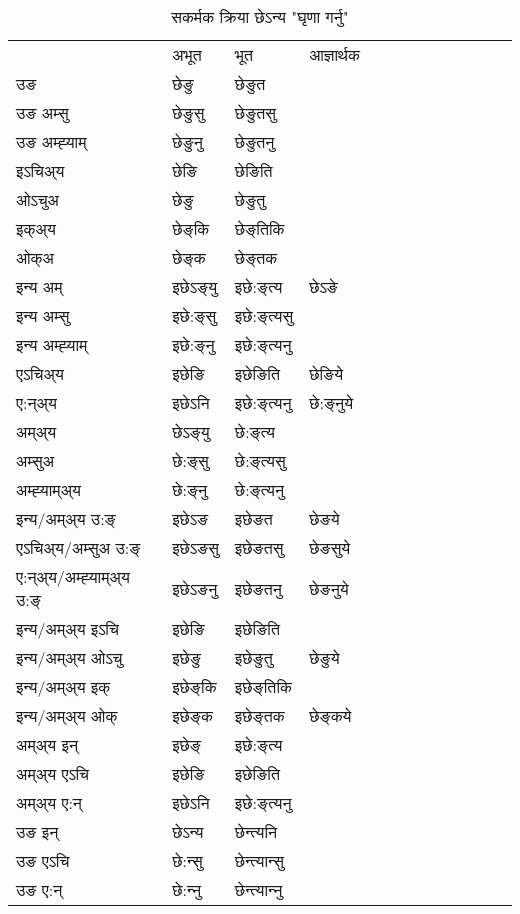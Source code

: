 \begin{table}[H]
\label{eŋ.vt} \centering
\caption{सकर्मक क्रिया  छेऽन्य  "घृणा गर्नु"  }
\begin{tabular}{l|l|l|l|l|l|l|l|l|l|l|l|l}  \toprule
&अभूत & भूत & आज्ञार्थक \\ 
उङ &छेङु &छेङुत \\ 
उङ अम्सु &छेङुसु &छेङुतसु \\ 
उङ अम्ह्‍याम् &छेङुनु &छेङुतनु \\ 
इऽचिअ्य &छेङि &छेङिति   \\ 
ओऽचुअ &छेङु &छेङुतु   \\ 
इक्अ्य &छेङ्‌कि &छेङ्‌तिकि   \\ 
ओक्अ &छेङ्‌क &छेङ्‌तक   \\ 
इन्य अम् & इछेऽङ्‌यु  & इछे:ङ्‌त्य &छेऽङे  \\ 
इन्य अम्सु & इछे:ङ्‌सु  & इछे:ङ्‌त्यसु   \\ 
इन्य अम्ह्‍याम् & इछे:ङ्‌नु  & इछे:ङ्‌त्यनु   \\ 
एऽचिअ्य & इछेङि & इछेङिति &छेङिये    \\ 
ए:न्अ्य & इछेऽनि  & इछे:ङ्‌त्यनु &छे:ङ्‌नुये  \\ 
अम्अ्य & छेऽङ्‌यु  & छे:ङ्‌त्य  \\ 
अम्सुअ & छे:ङ्‌सु & छे:ङ्‌त्यसु  \\ 
अम्ह्‍याम्अ्य & छे:ङ्‌नु  & छे:ङ्‌त्यनु \\ 
\midrule
इन्य/अम्अ्य उ:ङ्‌&इछेऽङ & इछेङत &छेङये \\ 
एऽचिअ्य/अम्सुअ उ:ङ्‌ &इछेऽङसु & इछेङतसु &छेङसुये \\ 
ए:न्अ्य/अम्ह्‍याम्अ्य उ:ङ्‌ &इछेऽङनु & इछेङतनु &छेङनुये \\ 
इन्य/अम्अ्य इऽचि & इछेङि & इछेङिति    \\ 
इन्य/अम्अ्य ओऽचु & इछेङु & इछेङुतु  &छेङुये  \\ 
इन्य/अम्अ्य इक् & इछेङ्‌कि & इछेङ्‌तिकि   \\ 
इन्य/अम्अ्य ओक् & इछेङ्‌क & इछेङ्‌तक  &छेङ्‌कये  \\ 
अम्अ्य इन् & इछेङ्‌ & इछे:ङ्‌त्य   \\ 
अम्अ्य एऽचि & इछेङि & इछेङिति    \\ 
अम्अ्य ए:न् & इछेऽनि  & इछे:ङ्‌त्यनु  \\ 
\midrule
उङ इन् & छेऽन्य  & छेन्त्यनि  \\ 
उङ एऽचि & छे:न्सु  & छेन्त्यान्सु   \\ 
उङ ए:न्& छे:न्‍नु  & छेन्त्यान्‍नु   \\ 
\bottomrule
\end{tabular}
\end{table}


